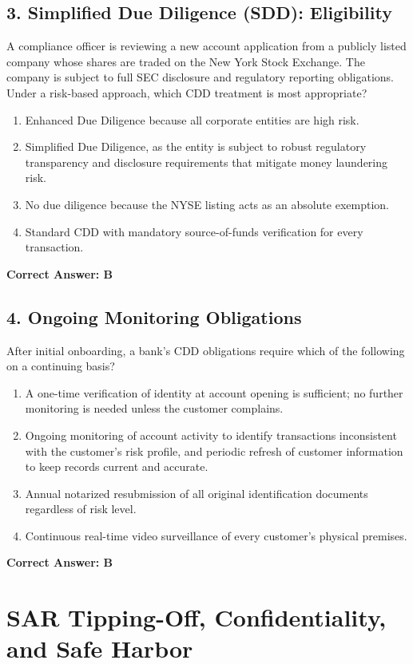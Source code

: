\documentclass[11pt,a4paper]{article}
\begin{document}
	\subsection{3. Simplified Due Diligence (SDD): Eligibility}
	A compliance officer is reviewing a new account application from a publicly listed company whose shares are traded on the New York Stock Exchange. The company is subject to full SEC disclosure and regulatory reporting obligations. Under a risk-based approach, which CDD treatment is most appropriate?
	\begin{enumerate}[label=\Alph*.]
		\item Enhanced Due Diligence because all corporate entities are high risk.
		\item Simplified Due Diligence, as the entity is subject to robust regulatory transparency and disclosure requirements that mitigate money laundering risk.
		\item No due diligence because the NYSE listing acts as an absolute exemption.
		\item Standard CDD with mandatory source-of-funds verification for every transaction.
	\end{enumerate}
	\textbf{Correct Answer: B}
	
	\subsection{4. Ongoing Monitoring Obligations}
	After initial onboarding, a bank's CDD obligations require which of the following on a continuing basis?
	\begin{enumerate}[label=\Alph*.]
		\item A one-time verification of identity at account opening is sufficient; no further monitoring is needed unless the customer complains.
		\item Ongoing monitoring of account activity to identify transactions inconsistent with the customer's risk profile, and periodic refresh of customer information to keep records current and accurate.
		\item Annual notarized resubmission of all original identification documents regardless of risk level.
		\item Continuous real-time video surveillance of every customer's physical premises.
	\end{enumerate}
	\textbf{Correct Answer: B}
	
	\section{SAR Tipping-Off, Confidentiality, and Safe Harbor}
	
\end{document}
